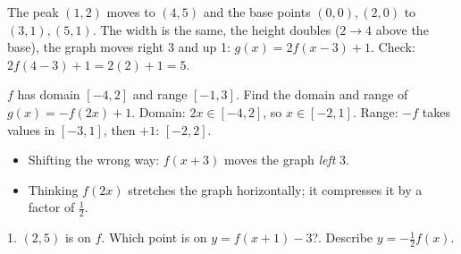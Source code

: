 \begin{example}
\begin{center}
\end{center}
\sol The peak $(1,2)$ moves to $(4,5)$ and the base points $(0,0),(2,0)$ to $(3,1),(5,1)$. The width is the same, the height doubles ($2\to4$ above the base), the graph moves right 3 and up 1: $g(x)=2f(x-3)+1$. Check: $2f(4-3)+1=2(2)+1=5$.
\end{example}

\begin{example}
$f$ has domain $[-4,2]$ and range $[-1,3]$. Find the domain and range of $g(x)=-f(2x)+1$.
\sol Domain: $2x\in[-4,2]$, so $x\in[-2,1]$. Range: $-f$ takes values in $[-3,1]$, then $+1$: $[-2,2]$.
\end{example}

\begin{mistakes}
\begin{itemize}
\item Shifting the wrong way: $f(x+3)$ moves the graph \emph{left} 3.
\item Thinking $f(2x)$ stretches the graph horizontally; it compresses it by a factor of $\frac12$.
\end{itemize}
\end{mistakes}

\begin{quickcheck}
1. $(2,5)$ is on $f$. Which point is on $y=f(x+1)-3$?. Describe $y=-\frac12f(x)$.
\end{quickcheck}


